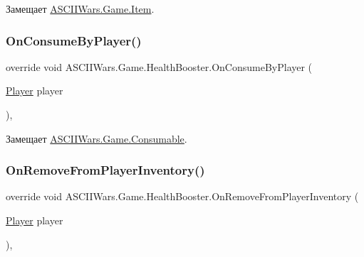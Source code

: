 Замещает \hyperlink{class_a_s_c_i_i_wars_1_1_game_1_1_item_aec0355b7a9f647ef24897b95563f70d1}{A\+S\+C\+I\+I\+Wars.\+Game.\+Item}.

\hypertarget{class_a_s_c_i_i_wars_1_1_game_1_1_health_booster_a0dd6134e102b2b4ea9d143b7cea15568}{}\label{class_a_s_c_i_i_wars_1_1_game_1_1_health_booster_a0dd6134e102b2b4ea9d143b7cea15568} 
\subsubsection{\texorpdfstring{On\+Consume\+By\+Player()}{OnConsumeByPlayer()}}
{\footnotesize\ttfamily override void A\+S\+C\+I\+I\+Wars.\+Game.\+Health\+Booster.\+On\+Consume\+By\+Player (\begin{DoxyParamCaption}\item[{\hyperlink{class_a_s_c_i_i_wars_1_1_game_1_1_player}{Player}}]{player }\end{DoxyParamCaption})\hspace{0.3cm}{\ttfamily [inline]}, {\ttfamily [virtual]}}



Замещает \hyperlink{class_a_s_c_i_i_wars_1_1_game_1_1_consumable_a6aac67fe076ca39cb850e3720461fff8}{A\+S\+C\+I\+I\+Wars.\+Game.\+Consumable}.

\hypertarget{class_a_s_c_i_i_wars_1_1_game_1_1_health_booster_ae06407b04a0e81da31c14c546d6aaaaf}{}\label{class_a_s_c_i_i_wars_1_1_game_1_1_health_booster_ae06407b04a0e81da31c14c546d6aaaaf} 
\subsubsection{\texorpdfstring{On\+Remove\+From\+Player\+Inventory()}{OnRemoveFromPlayerInventory()}}
{\footnotesize\ttfamily override void A\+S\+C\+I\+I\+Wars.\+Game.\+Health\+Booster.\+On\+Remove\+From\+Player\+Inventory (\begin{DoxyParamCaption}\item[{\hyperlink{class_a_s_c_i_i_wars_1_1_game_1_1_player}{Player}}]{player }\end{DoxyParamCaption})\hspace{0.3cm}{\ttfamily [inline]}, {\ttfamily [virtual]}}



